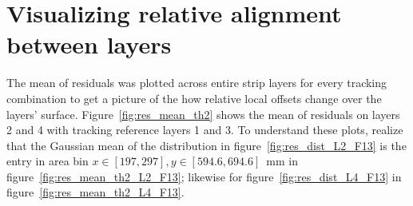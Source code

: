 \section{Visualizing relative alignment between layers}

The mean of residuals was plotted across entire strip layers for every tracking combination to get a picture of the how relative local offsets change over the layers' surface. Figure~\ref{fig:res_mean_th2} shows the mean of residuals on layers 2 and 4 with tracking reference layers 1 and 3. To understand these plots, realize that the Gaussian mean of the distribution in figure~\ref{fig:res_dist_L2_F13} is the entry in area bin $x\in\left[197, 297\right],  y\in\left[594.6, 694.6\right]$~mm in figure~\ref{fig:res_mean_th2_L2_F13}; likewise for figure~\ref{fig:res_dist_L4_F13} in figure~\ref{fig:res_mean_th2_L4_F13}.

